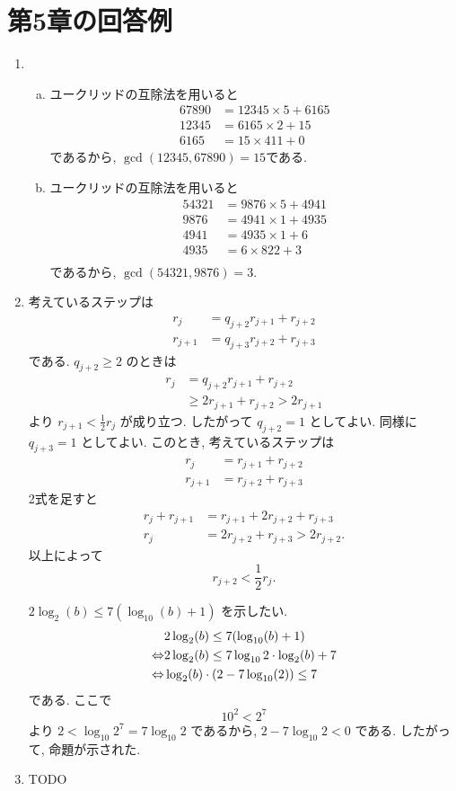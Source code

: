 \documentclass{jarticle}
\newcommand{\cnt}[1]{\noindent \underline{\textbf{#1}}}
\begin{document}
\section{第5章の回答例} %
\begin{enumerate}[\cnt{5.1}] %
\item
\begin{enumerate}[(a)] %
  \item ユークリッドの互除法を用いると
    \begin{align*}
      67890 &= 12345 \times 5 + 6165 \\
      12345 &= 6165 \times 2 + 15 \\
      6165  &= 15 \times 411 + 0
    \end{align*}
    であるから, $\gcd(12345, 67890) = 15$である.
  \item ユークリッドの互除法を用いると
    \begin{align*}
      54321 &= 9876 \times 5   + 4941 \\
      9876  &= 4941 \times 1   + 4935 \\
      4941  &= 4935 \times 1   + 6    \\
      4935  &= 6    \times 822 + 3    \\
    \end{align*}
    であるから, $\gcd(54321, 9876) = 3$.
\end{enumerate} %
\item %
考えているステップは
\begin{align*}
  r_j     &= q_{j+2}r_{j+1} + r_{j+2} \\
  r_{j+1} &= q_{j+3}r_{j+2} + r_{j+3}
\end{align*}
である.
$q_{j+2} \ge 2$ のときは
\begin{align*}
  r_j
    &= q_{j+2}r_{j+1} + r_{j+2} \\
    &\ge 2r_{j+1} + r_{j+2} > 2r_{j+1}
\end{align*}
より $r_{j+1} < \frac{1}{2} r_j$ が成り立つ.
したがって $q_{j+2} = 1$ としてよい.
同様に$q_{j+3} = 1$ としてよい.
このとき, 考えているステップは
\begin{align*}
  r_j &= r_{j+1} + r_{j+2} \\
  r_{j+1} &= r_{j+2} + r_{j+3}
\end{align*}
2式を足すと
\begin{align*}
  r_{j} + r_{j+1} &= r_{j+1} + 2r_{j+2} + r_{j+3} \\
  r_j &= 2r_{j+2} + r_{j+3} > 2r_{j+2}.
\end{align*}
以上によって
\[
  r_{j+2} < \frac{1}{2} r_j.
\]

$2 \log_2(b) \le 7(\log_{10}(b) + 1)$ を示したい.
\begin{align*}
  & 2\log_{2}(b) \le 7(\log_{10}(b) + 1) \\
  \Leftrightarrow & 2\log_2(b) \le 7\log_{10}2 \cdot \log_2(b) + 7 \\
  \Leftrightarrow & \log_2(b) \cdot (2 - 7\log_{10}(2)) \le 7
\end{align*}
である.
ここで
\[
  10^2 < 2^7
\]
より $2 < \log_{10}2^7 = 7\log_{10} 2$ であるから, $2 - 7\log_{10} 2 < 0$ である.
したがって, 命題が示された.
\item TODO
\end{enumerate} %
\end{document}
